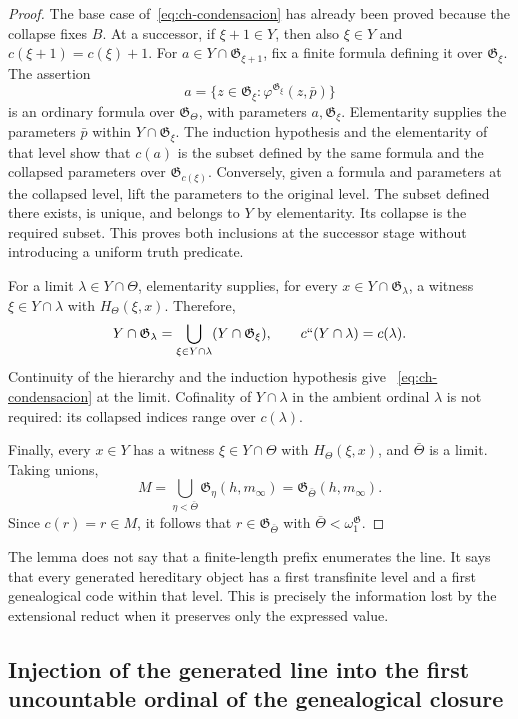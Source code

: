 \begin{proof}
The base case of~\eqref{eq:ch-condensacion} has already been proved because the
collapse fixes \(B\). At a successor, if \(\xi+1\in Y\), then also
\(\xi\in Y\) and \(c(\xi+1)=c(\xi)+1\). For
\(a\in Y\cap\mathfrak G_{\xi+1}\), fix a finite formula defining it over
\(\mathfrak G_\xi\). The assertion
\[
 a=\{z\in\mathfrak G_\xi:
                  \varphi^{\mathfrak G_\xi}(z,\bar p)\}
\]
is an ordinary formula over \(\mathfrak G_\Theta\), with parameters
\(a,\mathfrak G_\xi\). Elementarity supplies the parameters \(\bar p\) within
\(Y\cap\mathfrak G_\xi\). The induction hypothesis and the elementarity of
that level show that \(c(a)\) is the subset defined by the same formula and
the collapsed parameters over \(\mathfrak G_{c(\xi)}\). Conversely, given a
formula and parameters at the collapsed level, lift the parameters to the
original level. The subset defined there exists, is unique, and belongs to
\(Y\) by elementarity. Its collapse is the required subset. This proves both
inclusions at the successor stage without introducing a uniform truth
predicate.

For a limit \(\lambda\in Y\cap\Theta\), elementarity supplies, for every
\(x\in Y\cap\mathfrak G_\lambda\), a witness \(\xi\in Y\cap\lambda\) with
\(H_\Theta(\xi,x)\). Therefore,
\[
 Y\cap\mathfrak G_\lambda
 =\bigcup_{\xi\in Y\cap\lambda}(Y\cap\mathfrak G_\xi),
 \qquad c``(Y\cap\lambda)=c(\lambda).
\]
Continuity of the hierarchy and the induction hypothesis give
~\eqref{eq:ch-condensacion} at the limit. Cofinality of \(Y\cap\lambda\) in
the ambient ordinal \(\lambda\) is not required: its collapsed indices range
over \(c(\lambda)\).

Finally, every \(x\in Y\) has a witness \(\xi\in Y\cap\Theta\) with
\(H_\Theta(\xi,x)\), and \(\bar\Theta\) is a limit. Taking unions,
\[
 M=\bigcup_{\eta<\bar\Theta}\mathfrak G_\eta(h,m_\infty)
  =\mathfrak G_{\bar\Theta}(h,m_\infty).
\]
Since \(c(r)=r\in M\), it follows that
\(r\in\mathfrak G_{\bar\Theta}\) with
\(\bar\Theta<\omega_1^{\mathfrak G}\).
\end{proof}

The lemma does not say that a finite-length prefix enumerates the line. It says
that every generated hereditary object has a first transfinite level and a
first genealogical code within that level. This is precisely the information
lost by the extensional reduct when it preserves only the expressed value.

\subsection{Injection of the generated line into the first uncountable ordinal of the genealogical closure}

